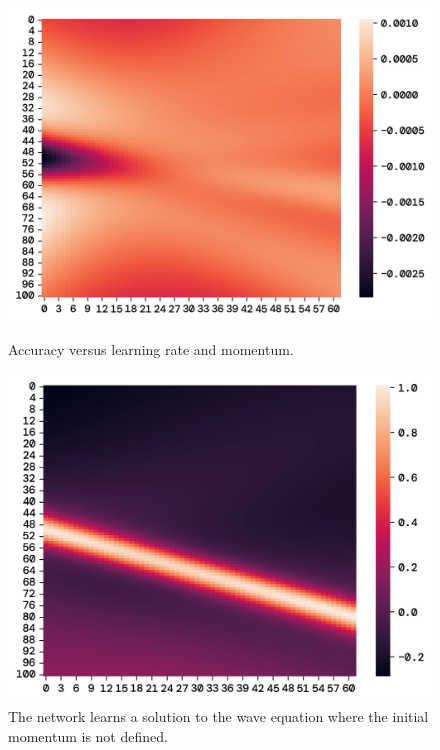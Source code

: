\documentclass[twoside,11pt]{report}
\begin{document}
    \begin{figure}[!ht]
        \begin{minipage}[t]{0.5\textwidth - 1mm}
            \begin{center}
                \includegraphics[width=\textwidth]{../runsAndFigures/wave_own_dnn.png}
            \end{center}
            \caption
            {
                Accuracy versus learning rate and momentum.
            }\label{fig:wave_own_dnn}
        \end{minipage}
        \hspace{2mm}
        \begin{minipage}[t]{0.5\textwidth - 1mm}
            \begin{center}
                \includegraphics[width=\textwidth]{../runsAndFigures/wave_tf_dnn_velocity.png}
            \end{center}
            \caption
            {
                The network learns a solution to the wave equation where the initial momentum is not defined.
            }\label{fig:wave_tf_dnn}
        \end{minipage}
    \end{figure}
\end{document}
